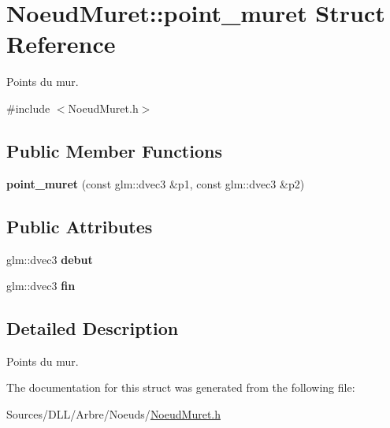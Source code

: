 \hypertarget{struct_noeud_muret_1_1point__muret}{}\section{Noeud\+Muret\+:\+:point\+\_\+muret Struct Reference}
\label{struct_noeud_muret_1_1point__muret}


Points du mur.  




{\ttfamily \#include $<$Noeud\+Muret.\+h$>$}

\subsection*{Public Member Functions}
\begin{DoxyCompactItemize}
\item 
\hypertarget{struct_noeud_muret_1_1point__muret_ac69905e3fbbfe9a0453ab78cb20aa44b}{}\label{struct_noeud_muret_1_1point__muret_ac69905e3fbbfe9a0453ab78cb20aa44b} 
{\bfseries point\+\_\+muret} (const glm\+::dvec3 \&p1, const glm\+::dvec3 \&p2)
\end{DoxyCompactItemize}
\subsection*{Public Attributes}
\begin{DoxyCompactItemize}
\item 
\hypertarget{struct_noeud_muret_1_1point__muret_a294381a61a5e78afcdb60902dee1c3c5}{}\label{struct_noeud_muret_1_1point__muret_a294381a61a5e78afcdb60902dee1c3c5} 
glm\+::dvec3 {\bfseries debut}
\item 
\hypertarget{struct_noeud_muret_1_1point__muret_ad2a2e0f42dd5c60dec0489cfe82ecb98}{}\label{struct_noeud_muret_1_1point__muret_ad2a2e0f42dd5c60dec0489cfe82ecb98} 
glm\+::dvec3 {\bfseries fin}
\end{DoxyCompactItemize}


\subsection{Detailed Description}
Points du mur. 

The documentation for this struct was generated from the following file\+:\begin{DoxyCompactItemize}
\item 
Sources/\+D\+L\+L/\+Arbre/\+Noeuds/\hyperlink{_noeud_muret_8h}{Noeud\+Muret.\+h}\end{DoxyCompactItemize}
